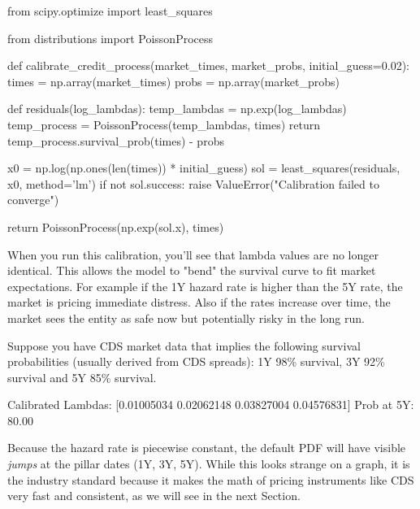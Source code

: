 \begin{ipythonnon}
from scipy.optimize import least_squares

from distributions import PoissonProcess

def calibrate_credit_process(market_times, market_probs, initial_guess=0.02):
  times = np.array(market_times)
  probs = np.array(market_probs)
    
  def residuals(log_lambdas):
    temp_lambdas = np.exp(log_lambdas)
    temp_process = PoissonProcess(temp_lambdas, times)
    return temp_process.survival_prob(times) - probs

  x0 = np.log(np.ones(len(times)) * initial_guess)
  sol = least_squares(residuals, x0, method='lm')   
  if not sol.success:
    raise ValueError("Calibration failed to converge")

  return PoissonProcess(np.exp(sol.x), times)
\end{ipythonnon}

When you run this calibration, you'll see that lambda values are no longer identical. This allows the model to "bend" the survival curve to fit market expectations. For example if the 1Y hazard rate is higher than the 5Y rate, the market is pricing immediate distress. Also if the rates increase over time, the market sees the entity as safe now but potentially risky in the long run.

Suppose you have CDS market data that implies the following survival probabilities (usually derived from CDS spreads): 1Y 98\% survival, 3Y 92\% survival and 5Y 85\% survival.

\begin{ioutput}
Calibrated Lambdas: [0.01005034 0.02062148 0.03827004 0.04576831]
Prob at 5Y: 80.00%
\end{ioutput}

Because the hazard rate is piecewise constant, the default PDF will have visible \textit{jumps} at the pillar dates (1Y, 3Y, 5Y). While this looks strange on a graph, it is the industry standard because it makes the math of pricing instruments like CDS very fast and consistent, as we will see in the next Section.

